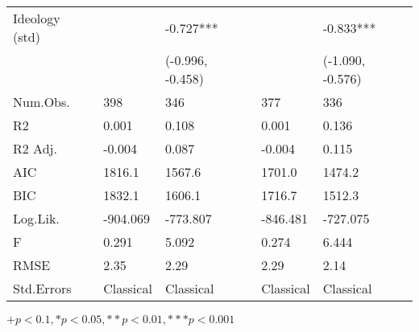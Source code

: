 \begin{table}[th!]
\begin{threeparttable}
\begin{tabular}{lC{3cm}C{3cm}C{3cm}C{3cm}}
 Ideology (std) &                 &               -0.727*** &                 &                -0.833*** \\
                &                 &        (-0.996, -0.458) &                 &         (-1.090, -0.576) \\
       Num.Obs. &             398 &                     346 &             377 &                      336 \\
             R2 &           0.001 &                   0.108 &           0.001 &                    0.136 \\
        R2 Adj. &          -0.004 &                   0.087 &          -0.004 &                    0.115 \\
            AIC &          1816.1 &                  1567.6 &          1701.0 &                   1474.2 \\
            BIC &          1832.1 &                  1606.1 &          1716.7 &                   1512.3 \\
       Log.Lik. &        -904.069 &                -773.807 &        -846.481 &                 -727.075 \\
              F &           0.291 &                   5.092 &           0.274 &                    6.444 \\
           RMSE &            2.35 &                    2.29 &            2.29 &                     2.14 \\
     Std.Errors &       Classical &               Classical &       Classical &                Classical \\
\bottomrule
\end{tabular}
\begin{tablenotes}
\item \footnotesize $+ p < 0.1, * p < 0.05, ** p < 0.01, *** p < 0.001$
\end{tablenotes}
\end{threeparttable}
\end{table}
